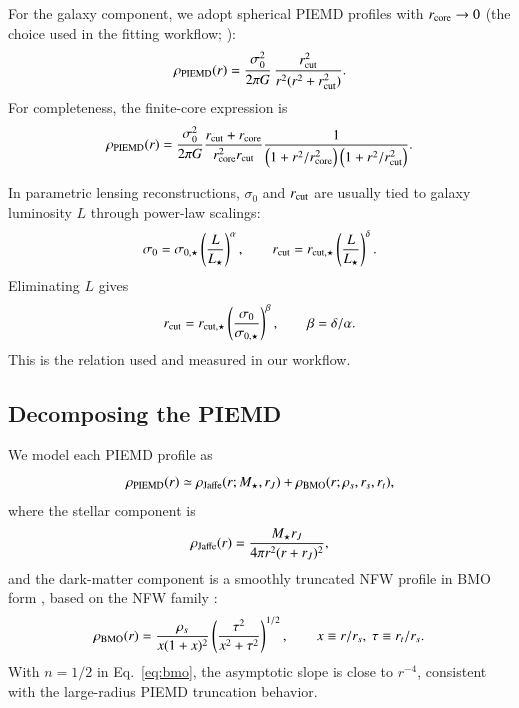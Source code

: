 \documentclass{aa}
\begin{document}
For the galaxy component, we adopt spherical PIEMD profiles with $r_{\rm core}\to 0$ (the choice used in the fitting workflow; \citealt{Jullo2007,Bergamini2019}):
\begin{equation}
\rho_{\rm PIEMD}(r)=\frac{\sigma_0^2}{2\pi G}\,\frac{r_{\rm cut}^2}{r^2(r^2+r_{\rm cut}^2)}.
\label{eq:piemd_singular}
\end{equation}
For completeness, the finite-core expression is
\begin{equation}
\rho_{\rm PIEMD}(r)=\frac{\sigma_0^2}{2\pi G}\frac{r_{\rm cut}+r_{\rm core}}{r_{\rm core}^2 r_{\rm cut}}\frac{1}{\left(1+r^2/r_{\rm core}^2\right)\left(1+r^2/r_{\rm cut}^2\right)}.
\label{eq:piemd_full}
\end{equation}

In parametric lensing reconstructions, $\sigma_0$ and $r_{\rm cut}$ are usually tied to galaxy luminosity $L$ through power-law scalings:
\begin{equation}
\sigma_0 = \sigma_{0,\star}\left(\frac{L}{L_\star}\right)^{\alpha},
\qquad
r_{\rm cut}=r_{{\rm cut},\star}\left(\frac{L}{L_\star}\right)^{\delta}.
\label{eq:lum_scalings}
\end{equation}
Eliminating $L$ gives
\begin{equation}
r_{\rm cut}=r_{{\rm cut},\star}\left(\frac{\sigma_0}{\sigma_{0,\star}}\right)^{\beta},
\qquad \beta=\delta/\alpha.
\label{eq:rcut_sigma}
\end{equation}
This is the relation used and measured in our workflow.

\subsection{Decomposing the PIEMD}
We model each PIEMD profile as
\begin{equation}
\rho_{\rm PIEMD}(r) \simeq \rho_{\rm Jaffe}(r;M_\star,r_J) + \rho_{\rm BMO}(r;\rho_s,r_s,r_t),
\label{eq:decomp}
\end{equation}
where the stellar component is \citep{Jaffe1983}
\begin{equation}
\rho_{\rm Jaffe}(r)=\frac{M_\star r_J}{4\pi r^2(r+r_J)^2},
\label{eq:jaffe}
\end{equation}
and the dark-matter component is a smoothly truncated NFW profile in BMO form \citep{Baltz2009}, based on the NFW family \citep{NFW1996,NFW1997}:
\begin{equation}
\rho_{\rm BMO}(r)=\frac{\rho_s}{x(1+x)^2}\left(\frac{\tau^2}{x^2+\tau^2}\right)^{1/2},
\qquad x\equiv r/r_s,\ \tau\equiv r_t/r_s.
\label{eq:bmo}
\end{equation}
With $n=1/2$ in Eq.~\ref{eq:bmo}, the asymptotic slope is close to $r^{-4}$, consistent with the large-radius PIEMD truncation behavior.
\end{document}
